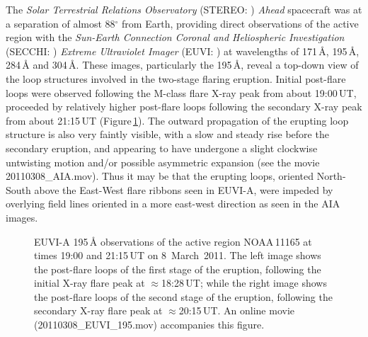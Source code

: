 \documentclass[namedreferences]{solarphysics}
\begin{document}
\begin{article}
The \emph{Solar Terrestrial Relations Observatory} (STEREO: ) \emph{Ahead} spacecraft was at a separation of almost 88$^{\circ}$ from Earth, providing direct observations of the active region with the \emph{Sun-Earth Connection Coronal and Heliospheric Investigation} (SECCHI: ) \emph{Extreme Ultraviolet Imager} (EUVI: ) at wavelengths of 171\,{\AA}, 195\,{\AA}, 284\,{\AA} and 304\,{\AA}. These images, particularly the 195\,{\AA}, reveal a top-down view of the loop structures involved in the two-stage flaring eruption. Initial post-flare loops were observed following the M-class flare X-ray peak from about 19:00\,UT, proceeded by relatively higher post-flare loops following the secondary X-ray peak from about 21:15\,UT (Figure\,\ref{euvi}). The outward propagation of the erupting loop structure is also very faintly visible, with a slow and steady rise before the secondary eruption, and appearing to have undergone a slight clockwise untwisting motion and/or possible asymmetric expansion (see the movie 20110308\_AIA.mov). Thus it may be that the erupting loops, oriented North-South above the East-West flare ribbons seen in EUVI-A, were impeded by overlying field lines oriented in a more east-west direction as seen in the AIA images.

\begin{figure}[!t]
\caption{EUVI-A 195\,{\AA} observations of the active region NOAA\,11165 at times 19:00 and 21:15\,UT on 8~March~2011. The left image shows the post-flare loops of the first stage of the eruption, following the initial X-ray flare peak at $\approx$18:28\,UT; while the right image shows the post-flare loops of the second stage of the eruption, following the secondary X-ray flare peak at $\approx$20:15\,UT. An online movie (20110308\_EUVI\_195.mov) accompanies this figure.}
\label{euvi}
\end{figure}


\end{article}
\end{document}
